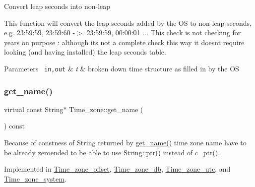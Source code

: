 Convert leap seconds into non-\/leap

This function will convert the leap seconds added by the OS to non-\/leap seconds, e.\+g. 23\+:59\+:59, 23\+:59\+:60 -\/$>$ 23\+:59\+:59, 00\+:00\+:01 ... This check is not checking for years on purpose \+: although it\textquotesingle{}s not a complete check this way it doesn\textquotesingle{}t require looking (and having installed) the leap seconds table.


\begin{DoxyParams}[1]{Parameters}
\mbox{\texttt{ in,out}}  & {\em t} & broken down time structure as filled in by the OS \\
\hline
\end{DoxyParams}
\mbox{\label{classTime__zone_a8116436f7b8e19dc4b99cd78a786e47f}} 
\subsubsection{\texorpdfstring{get\+\_\+name()}{get\_name()}}
{\footnotesize\ttfamily virtual const String$\ast$ Time\+\_\+zone\+::get\+\_\+name (\begin{DoxyParamCaption}{ }\end{DoxyParamCaption}) const\hspace{0.3cm}{\ttfamily [pure virtual]}}

Because of constness of String returned by \mbox{\hyperlink{classTime__zone_a8116436f7b8e19dc4b99cd78a786e47f}{get\+\_\+name()}} time zone name have to be already zeroended to be able to use String\+::ptr() instead of c\+\_\+ptr(). 

Implemented in \mbox{\hyperlink{classTime__zone__offset_a4d9694d180deaca9af20beb7e785d9dd}{Time\+\_\+zone\+\_\+offset}}, \mbox{\hyperlink{classTime__zone__db_a64a55114c5945e21840cdc4862f4b831}{Time\+\_\+zone\+\_\+db}}, \mbox{\hyperlink{classTime__zone__utc_ae9e3ff6abe408adbb9005540ffee605c}{Time\+\_\+zone\+\_\+utc}}, and \mbox{\hyperlink{classTime__zone__system_a8bca725b2252584788aedf52366acdaf}{Time\+\_\+zone\+\_\+system}}.

\mbox{\label{classTime__zone_a7a15d4406de10928f8e39eb3549770a4}} 
